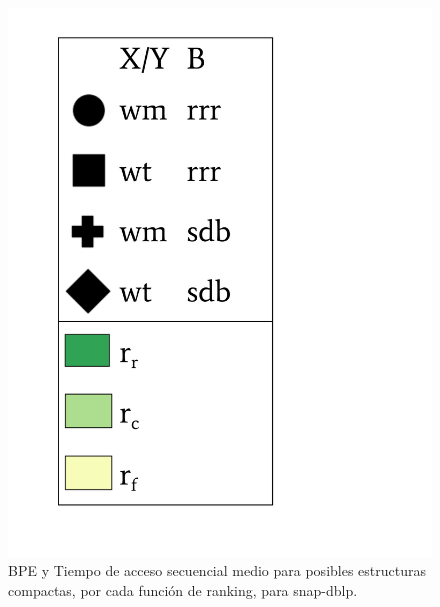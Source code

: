 \begin{frame}
\begin{figure}
\begin{minipage}{1\textwidth}
\begin{minipage}{0.15\textwidth}
    			\includegraphics[scale=.15, clip, trim=70 0 0 0]{../img/sdsl/label.pdf}
    		\end{minipage}	
    	\end{minipage}

	\caption{BPE y Tiempo de acceso secuencial medio para posibles estructuras compactas, por cada función de ranking, para snap-dblp.}
\end{figure}

\end{frame}

